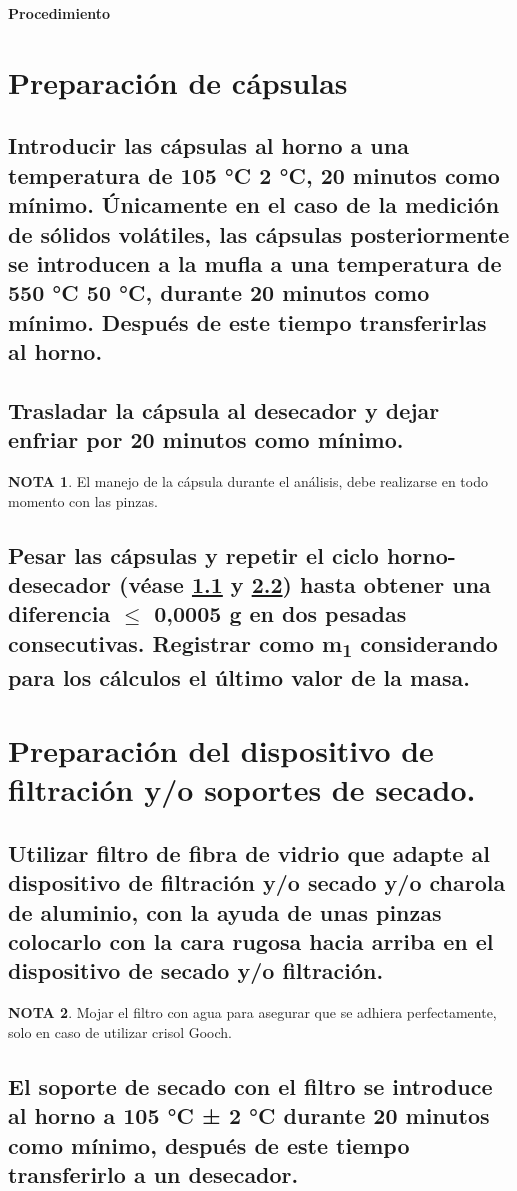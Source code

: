 \documentclass[spanish,12pt,letterpaper,titlepage]{article}
\theoremstyle{definition}
\newtheorem{teor}{NOTA}
\begin{document}
	\noindent\Large{\textbf{Procedimiento}}
	\normalsize
	\section{Preparación de cápsulas}\label{9.1}
	\subsection{Introducir las cápsulas al horno a una temperatura de 105 °C  2 °C, 20 minutos como mínimo. Únicamente en el caso de la medición de sólidos volátiles, las cápsulas posteriormente se introducen a la mufla a una temperatura de 550 °C  50 °C, durante 20 minutos como mínimo. Después de este tiempo transferirlas al horno.}\label{9.1.1}
	\subsection{Trasladar la cápsula al desecador y dejar enfriar por 20 minutos como mínimo.}\label{9.1.2}
	\begin{teor}
		El manejo de la cápsula durante el análisis, debe realizarse en todo momento con las pinzas.
	\end{teor}
	\subsection{Pesar las cápsulas y repetir el ciclo horno-desecador (véase \ref{9.1.1} y \ref{9.2.2}) hasta obtener una diferencia $\leq$ 0,0005 g en dos pesadas consecutivas. Registrar como m\textsubscript{1} considerando para los cálculos el último valor de la masa.}\label{9.1.3}
	\section{Preparación del dispositivo de filtración y/o soportes de secado.}\label{9.2}
	\subsection{Utilizar filtro de fibra de vidrio que adapte al dispositivo de filtración y/o secado y/o charola de aluminio, con la ayuda de unas pinzas colocarlo con la cara rugosa hacia arriba en el dispositivo de secado y/o filtración.}\label{9.2.1}
	\begin{teor}
		Mojar el filtro con agua para asegurar que se adhiera perfectamente, solo en caso de utilizar crisol Gooch.
	\end{teor}
	\subsection{El soporte de secado con el filtro se introduce al horno a 105 °C ± 2 °C durante 20 minutos como mínimo, después de este tiempo transferirlo a un desecador.} \label{9.2.2}
\end{document}
